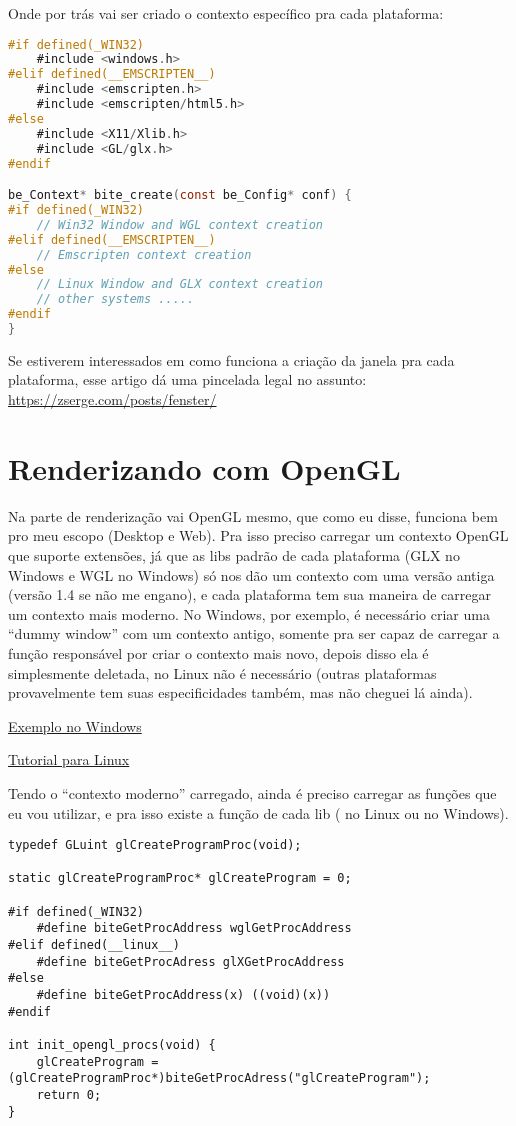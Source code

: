\documentclass[a4paper,oneside,12pt]{article}
\begin{document}
Onde por trás vai ser criado o contexto específico pra cada plataforma:

\begin{lstlisting}[language=C]
#if defined(_WIN32)
	#include <windows.h>
#elif defined(__EMSCRIPTEN__)
	#include <emscripten.h>
	#include <emscripten/html5.h>
#else
	#include <X11/Xlib.h>
	#include <GL/glx.h>
#endif

be_Context* bite_create(const be_Config* conf) {
#if defined(_WIN32)
	// Win32 Window and WGL context creation
#elif defined(__EMSCRIPTEN__)
	// Emscripten context creation
#else
	// Linux Window and GLX context creation
	// other systems .....
#endif
}
\end{lstlisting}

Se estiverem interessados em como funciona a criação da janela pra cada plataforma, esse artigo dá uma pincelada legal no assunto: \url{https://zserge.com/posts/fenster/}

\section{Renderizando com OpenGL}

Na parte de renderização vai OpenGL mesmo, que como eu disse, funciona bem pro meu escopo (Desktop e Web). Pra isso preciso carregar um contexto OpenGL que suporte extensões, já que as libs padrão de cada plataforma (GLX no Windows e WGL no Windows) só nos dão um contexto com uma versão antiga (versão 1.4 se não me engano), e cada plataforma tem sua maneira de carregar um contexto mais moderno. No Windows, por exemplo, é necessário criar uma ``dummy window'' com um contexto antigo, somente pra ser capaz de carregar a função responsável por criar o contexto mais novo, depois disso ela é simplesmente deletada, no Linux não é necessário (outras plataformas provavelmente tem suas especificidades também, mas não cheguei lá ainda).

\href{https://gist.github.com/nickrolfe/1127313ed1dbf80254b614a721b3ee9c}{Exemplo no Windows}

\href{https://apoorvaj.io/creating-a-modern-opengl-context/}{Tutorial para Linux}

Tendo o “contexto moderno” carregado, ainda é preciso carregar as funções que eu vou utilizar, e pra isso existe a função  de cada lib ( no Linux ou  no Windows).

\begin{lstlisting}
typedef GLuint glCreateProgramProc(void);

static glCreateProgramProc* glCreateProgram = 0;

#if defined(_WIN32)
    #define biteGetProcAddress wglGetProcAddress
#elif defined(__linux__)
    #define biteGetProcAdress glXGetProcAddress
#else
    #define biteGetProcAddress(x) ((void)(x))
#endif

int init_opengl_procs(void) {
    glCreateProgram = (glCreateProgramProc*)biteGetProcAdress("glCreateProgram");
    return 0;
}
\end{lstlisting}
\end{document}
